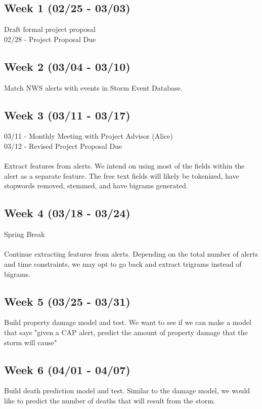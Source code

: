 \documentclass{article}
\begin{document}
\subsection*{Week 1 (02/25 - 03/03)}
Draft formal project proposal\\
02/28 - Project Proposal Due

\subsection*{Week 2 (03/04 - 03/10)}
Match NWS alerts with events in Storm Event Database.

\subsection*{Week 3 (03/11 - 03/17)}
03/11 - Monthly Meeting with Project Advisor (Alice)\\
03/12 - Revised Project Proposal Due\\
\\
Extract features from alerts. We intend on using most of the fields within the alert as a separate feature. The free text fields will likely be tokenized, have stopwords removed, stemmed, and have bigrams generated. 

\subsection*{Week 4 (03/18 - 03/24)}
Spring Break\\
\\
Continue extracting features from alerts. Depending on the total number of alerts and time constraints, we may opt to go back and extract trigrams instead of bigrams.

\subsection*{Week 5 (03/25 - 03/31)}
Build property damage model and test. We want to see if we can make a model that says "given a CAP alert, predict the amount of property damage that the storm will cause"

\subsection*{Week 6 (04/01 - 04/07)}
Build death prediction model and test. Similar to the damage model, we would like to predict the number of deaths that will result from the storm.
\end{document}
